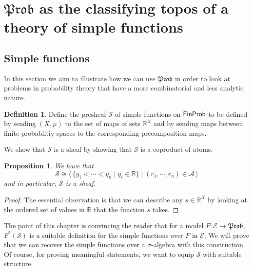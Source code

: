 \documentclass[a4paper]{amsproc}
\theoremstyle{plain}
\newtheorem{proposition}[theorem]{Proposition}
\theoremstyle{definition}
\newtheorem{definition}[theorem]{Definition}
\theoremstyle{remark}
\numberwithin{equation}{section}
\newcommand{\FinProb}{\textup{\textsf{FinProb}}}
\newcommand{\Prob}{\mathfrak{Prob}}
\newcommand{\la}{\langle\,}
\newcommand{\ra}{\,\rangle}
\begin{document}
\section{$\Prob$ as the classifying topos of a theory of simple functions}

\subsection{Simple functions} \label{simple_functions}

In this section we aim to illustrate how we can use $\Prob$ in order to look at problems in probability theory that have a more combinatorial and less analytic nature.


\begin{definition}
    Define the presheaf $\mathcal{S}$ of simple functions on $\FinProb$ to be defined by sending $(X,\mu)$ to the set of maps of sets $\mathbb{R}^X$ and by sending maps between finite probablitiy spaces to the corresponding precomposition maps.
\end{definition}

We show that $\mathcal{S}$ is a sheaf by showing that $\mathcal{S}$ is a coproduct of atoms.

\begin{proposition}
    We have that
    \[
        \mathcal{S} \cong \la \{y_1 < \cdots < y_n \mid y_i \in \mathbb{R} \} \mid (r_1, \cdots, r_n) \in \mathcal{A} \ra
    \]
    and in particular, $\mathcal{S}$ is a sheaf.
\end{proposition}
\begin{proof}
    The essential observation is that we can describe any $s \in \mathbb{R}^X$ by looking at the ordered set of values in $\mathbb{R}$ that the function $s$ takes.
\end{proof}


The point of this chapter is convincing the reader that for a model $F: \mathcal{E} \to \Prob$, $F^*(\mathcal{S})$ is a suitable definition for the simple functions over $F$ in $\mathcal{E}$. We will prove that we can recover the simple functions over a $\sigma$-algebra with this construction. Of course, for proving meaningful statements, we want to equip $\mathcal{S}$ with suitable structure.
\end{document}

